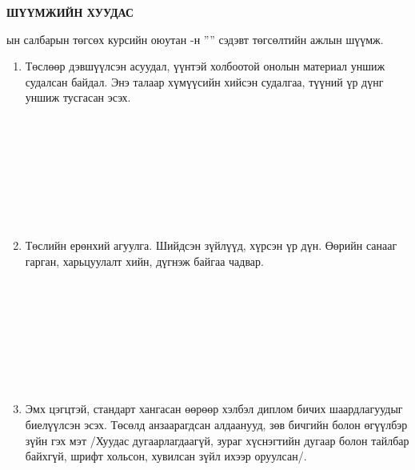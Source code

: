 \begin{titlepage}
\begin{center}

{\scshape\Large \univname\par} %
{\scshape\large \facname\par}\vspace{1cm} %

\textbf{{\Large ШҮҮМЖИЙН ХУУДАС}}\\[1cm]

\end{center}

\normalsize

\deptname ын салбарын төгсөх курсийн оюутан \shortname -н ''\ttitle'' сэдэвт төгсөлтийн ажлын шүүмж.

\begin{enumerate}
\item Төслөөр дэвшүүлсэн асуудал, үүнтэй холбоотой онолын материал уншиж судалсан байдал. Энэ талаар хүмүүсийн хийсэн судалгаа, түүний үр дүнг уншиж тусгасан эсэх.
\begin{center}
\dotfill \\[0.1cm]
\dotfill \\[0.1cm]
\dotfill \\[0.1cm]
\dotfill \\[0.1cm]
\dotfill \\[0.1cm]
\dotfill \\[0.1cm]
\dotfill \\[0.4cm]
\end{center}
\item Төслийн ерөнхий агуулга. Шийдсэн зүйлүүд, хүрсэн үр дүн. Өөрийн санааг гарган, харьцуулалт хийн, дүгнэж байгаа чадвар.
\begin{center}
\dotfill \\[0.1cm]
\dotfill \\[0.1cm]
\dotfill \\[0.1cm]
\dotfill \\[0.1cm]
\dotfill \\[0.1cm]
\dotfill \\[0.1cm]
\dotfill \\[0.4cm]
\end{center}
\item Эмх цэгцтэй, стандарт хангасан өөрөөр хэлбэл диплом бичих шаардлагуудыг биелүүлсэн эсэх. Төсөлд анзаарагдсан алдаанууд, зөв бичгийн болон өгүүлбэр зүйн гэх мэт /Хуудас дугаарлагдаагүй, зураг хүснэгтийн дугаар болон тайлбар байхгүй, шрифт хольсон, хувилсан зүйл ихээр оруулсан/.

\end{enumerate}
\end{titlepage}
